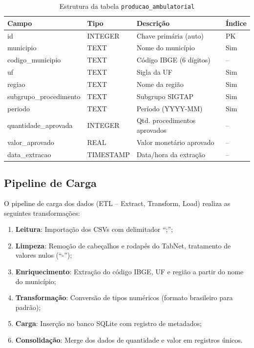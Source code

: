 \documentclass[
    12pt,
    oneside,
    a4paper,
    chapter=TITLE,
    section=TITLE
]{abntex2}
\begin{document}
\begin{table}[H]
\centering
\caption{Estrutura da tabela \texttt{producao\_ambulatorial}}
\label{tab:schema}
\begin{tabular}{llll}
\toprule
\textbf{Campo} & \textbf{Tipo} & \textbf{Descrição} & \textbf{Índice} \\
\midrule
id & INTEGER & Chave primária (auto) & PK \\
municipio & TEXT & Nome do município & Sim \\
codigo\_municipio & TEXT & Código IBGE (6 dígitos) & -- \\
uf & TEXT & Sigla da UF & Sim \\
regiao & TEXT & Nome da região & Sim \\
subgrupo\_procedimento & TEXT & Subgrupo SIGTAP & Sim \\
periodo & TEXT & Período (YYYY-MM) & Sim \\
quantidade\_aprovada & INTEGER & Qtd. procedimentos aprovados & -- \\
valor\_aprovado & REAL & Valor monetário aprovado & -- \\
data\_extracao & TIMESTAMP & Data/hora da extração & -- \\
\bottomrule
\end{tabular}
\end{table}

\subsection{Pipeline de Carga}

O pipeline de carga dos dados (ETL -- Extract, Transform, Load) realiza as seguintes transformações:

\begin{enumerate}
    \item \textbf{Leitura}: Importação dos CSVs com delimitador ``;'';
    \item \textbf{Limpeza}: Remoção de cabeçalhos e rodapés do TabNet, tratamento de valores nulos (``-'');
    \item \textbf{Enriquecimento}: Extração do código IBGE, UF e região a partir do nome do município;
    \item \textbf{Transformação}: Conversão de tipos numéricos (formato brasileiro para padrão);
    \item \textbf{Carga}: Inserção no banco SQLite com registro de metadados;
    \item \textbf{Consolidação}: Merge dos dados de quantidade e valor em registros únicos.
\end{enumerate}
\end{document}
